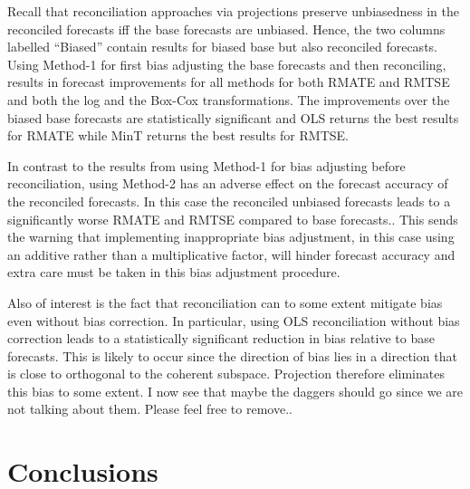 \documentclass[12pt]{article}
\theoremstyle{definition}
\begin{document}
Recall that reconciliation approaches via projections preserve unbiasedness in the reconciled forecasts iff the base forecasts are unbiased. Hence, the two columns labelled ``Biased'' contain results for biased base but also reconciled forecasts. Using Method-1 for first bias adjusting the base forecasts and then reconciling, results in forecast improvements for all methods {\color{blue} for both RMATE and RMTSE and} both the log and the Box-Cox transformations.  {\color{blue}The improvements over the biased base forecasts are statistically significant and OLS returns the best results for RMATE while MinT returns the best results for RMTSE.} %

In contrast to the results from using Method-1 for bias adjusting before reconciliation, using Method-2 has an adverse effect on the forecast accuracy of the reconciled forecasts. In this case the reconciled unbiased forecasts {\color{blue}leads to a significantly worse RMATE and RMTSE compared to base forecasts.}. This sends the warning that implementing inappropriate bias adjustment, in this case using an additive rather than a multiplicative factor, will hinder forecast accuracy and extra care must be taken in this bias adjustment procedure.

{\color{blue} Also  of interest is the fact that reconciliation can to some extent mitigate bias even without bias correction.  In particular, using OLS reconciliation without bias correction leads to a statistically significant reduction in bias relative to base forecasts.  This is likely to occur since the direction of bias lies in a direction that is close to orthogonal to the coherent subspace.  Projection therefore eliminates this bias to some extent.}{\color{red} I now see that maybe the daggers should go since we are not talking about them. Please feel free to remove.}.

\section{Conclusions}\label{sec:conclusions}

\end{document}
